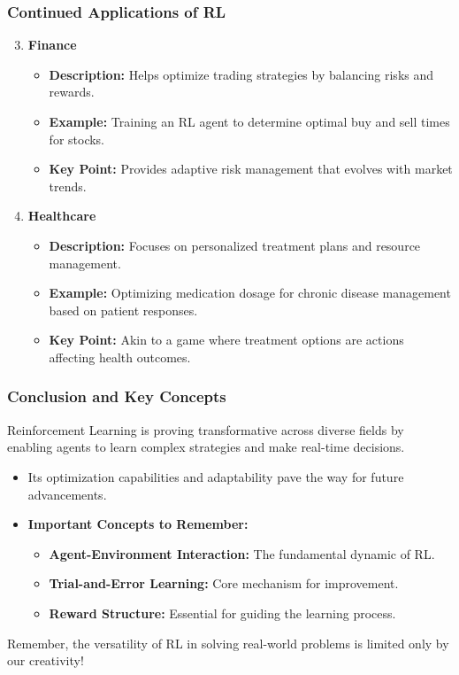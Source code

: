 \documentclass{beamer}
\begin{document}
\begin{frame}[fragile]
    \frametitle{Continued Applications of RL}
    \begin{enumerate}
        \setcounter{enumi}{2}
        \item \textbf{Finance}
            \begin{itemize}
                \item \textbf{Description:} Helps optimize trading strategies by balancing risks and rewards.
                \item \textbf{Example:} Training an RL agent to determine optimal buy and sell times for stocks.
                \item \textbf{Key Point:} Provides adaptive risk management that evolves with market trends.
            \end{itemize}

        \item \textbf{Healthcare}
            \begin{itemize}
                \item \textbf{Description:} Focuses on personalized treatment plans and resource management.
                \item \textbf{Example:} Optimizing medication dosage for chronic disease management based on patient responses.
                \item \textbf{Key Point:} Akin to a game where treatment options are actions affecting health outcomes.
            \end{itemize}
    \end{enumerate}
\end{frame}

\begin{frame}[fragile]
    \frametitle{Conclusion and Key Concepts}
    Reinforcement Learning is proving transformative across diverse fields by enabling agents to learn complex strategies and make real-time decisions. 
    \begin{itemize}
        \item Its optimization capabilities and adaptability pave the way for future advancements.
        \item \textbf{Important Concepts to Remember:}
            \begin{itemize}
                \item \textbf{Agent-Environment Interaction:} The fundamental dynamic of RL.
                \item \textbf{Trial-and-Error Learning:} Core mechanism for improvement.
                \item \textbf{Reward Structure:} Essential for guiding the learning process.
            \end{itemize}
    \end{itemize}
    \vspace{1em}
    Remember, the versatility of RL in solving real-world problems is limited only by our creativity!
\end{frame}
\end{document}
